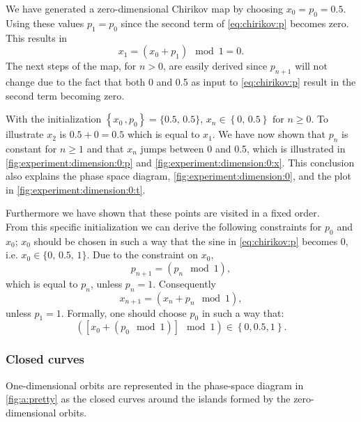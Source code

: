 We have generated a zero-dimensional Chirikov map by choosing $x_0 = p_0 = 0.5$. Using these values $p_1 = p_0$ since the second term of \eqref{eq:chirikov:p} becomes zero. This results in
\begin{equation*}
	x_1 = \left( x_0 + p_{1} \right) \mod 1= 0.	
\end{equation*}
The next steps of the map, for $n > 0$, are easily derived since $p_{n + 1}$ will not change due to the fact that both 0 and 0.5 as input to \eqref{eq:chirikov:p} result in the second term becoming zero. 

With the initialization $\left\{x_0\,, p_0 \right\} = \{{0.5},\,{0.5}\}$, $x_{n} \in \left\{0,\, 0.5 \right\} \text{ for } n \geq 0$. To illustrate $x_2$ is $0.5 + 0 = 0.5$ which is equal to $x_1$. We have now shown that $p_n$ is constant for $n \geq 1$ and that $x_n$ jumps between 0 and 0.5, which is illustrated in \cref{fig:experiment:dimension:0:p} and \cref{fig:experiment:dimension:0:x}. This conclusion also explains the phase space diagram, \cref{fig:experiment:dimension:0}, and the plot in \cref{fig:experiment:dimension:0:t}. 

Furthermore we have shown that these points are visited in a fixed order.\\

From this specific initialization we can derive the following constraints for $p_0$ and $x_0$; $x_0$ should be chosen in such a way that the sine in \cref{eq:chirikov:p} becomes 0, i.e. $x_0 \in \{0,\, 0.5,\, 1\}$. Due to the constraint on $x_0$,
\begin{equation*}
p_{n + 1} = \left( p_{n} \mod 1 \right),
\end{equation*}
	which is equal to $p_n$, unless $p_n = 1$. Consequently
	\begin{equation*}
	x_{n + 1} = \left( x_n + p_n \mod 1 \right),
	\end{equation*}
unless $p_1 = 1$. Formally, one should choose $p_0$ in such a way that:
\begin{equation*}
	\left( \left[ x_0 + (p_0 \mod 1)\right] \mod 1 \right) \in \left\{0, 0.5, 1\right\}.
\end{equation*}

\subsubsection{Closed curves}
\label{sss:experiment:a:closed}
One-dimensional orbits are represented in the phase-space diagram in \cref{fig:a:pretty} as the closed curves around the islands formed by the zero-dimensional orbits.

